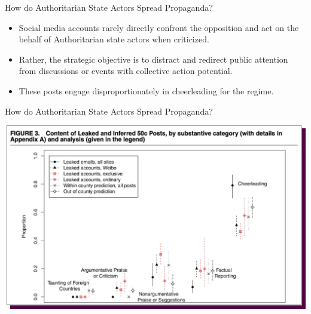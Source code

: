 \documentclass[nobackground,dvipsnames,table]{beamer}
\begin{document}
\begin{frame}{How do Authoritarian State Actors Spread Propaganda?}

\begin{itemize}
    \item Social media accounts rarely directly confront the opposition and act on the behalf of Authoritarian state actors when criticized.
    \item Rather, the strategic objective is to distract and redirect public attention from discussions or events with collective action potential.
    \item These posts engage disproportionately in cheerleading for the regime.
\end{itemize}
    
\end{frame}



\begin{frame}{How do Authoritarian State Actors Spread Propaganda?}

\includegraphics[width=\textwidth]{img/fig15.jpg}

    
\end{frame}
\end{document}
